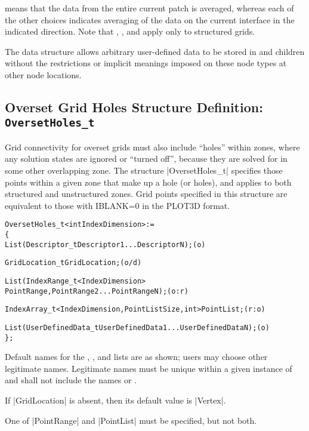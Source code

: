  means that the data from the entire current patch is
averaged, whereas each of the other choices indicates averaging of the
data on the current interface in the indicated direction.
Note that , , and 
apply only to structured grids.

The  data structure allows arbitrary
user-defined data to be stored in  and
 children without the restrictions or implicit
meanings imposed on these node types at other node locations.

\subsection{Overset Grid Holes Structure Definition: \texttt{OversetHoles\_t}}
\label{s:OversetHoles}

Grid connectivity for overset grids must also include ``holes'' within zones,
where any solution states are ignored or ``turned off'', because they are
solved for in some other overlapping zone.  The structure |OversetHoles_t|
specifies those points within a given zone that make up a hole (or holes),
and applies to both structured and unstructured zones.
Grid points specified in this structure are equivalent to those with
IBLANK=0 in the PLOT3D format.

\begin{alltt}
  OversetHoles\_t< int IndexDimension > :=
    \{
    List( Descriptor\_t Descriptor1 ... DescriptorN ) ;                      (o)

    GridLocation\_t GridLocation ;                                           (o/d)

    List( IndexRange\_t<IndexDimension> 
      PointRange, PointRange2 ... PointRangeN ) ;                           (o:r)

    IndexArray\_t<IndexDimension, PointListSize, int> PointList ;            (r:o)

    List( UserDefinedData\_t UserDefinedData1 ... UserDefinedDataN ) ;       (o)
    \} ;
\end{alltt}

\begin{notes}
\item
 Default names for the , , and
 lists are as shown; users may choose other legitimate names.
 Legitimate names must be unique 
 within a given instance of  and shall not include the
 names  or .
\item
 If |GridLocation| is absent, then its default value is |Vertex|.
\item
 One of |PointRange| and |PointList| must be specified, but not both.
\end{notes}

